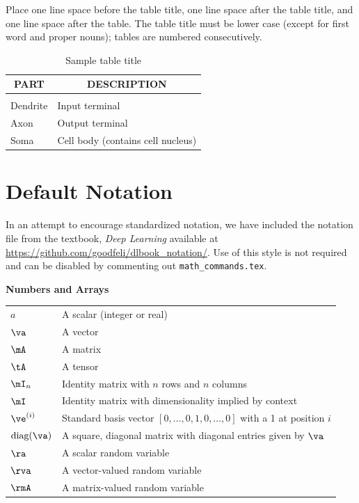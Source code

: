 \documentclass{article} %
\begin{document}
Place one line space before the table title, one line space after the table
title, and one line space after the table. The table title must be lower case
(except for first word and proper nouns); tables are numbered consecutively.

\begin{table}[t]
\caption{Sample table title}
\label{sample-table}
\begin{center}
\begin{tabular}{ll}
\multicolumn{1}{c}{\bf PART}  &\multicolumn{1}{c}{\bf DESCRIPTION}
\\ \hline \\
Dendrite         &Input terminal \\
Axon             &Output terminal \\
Soma             &Cell body (contains cell nucleus) \\
\end{tabular}
\end{center}
\end{table}

\section{Default Notation}

In an attempt to encourage standardized notation, we have included the
notation file from the textbook, \textit{Deep Learning}
\cite{goodfellow2016deep} available at
\url{https://github.com/goodfeli/dlbook_notation/}.  Use of this style
is not required and can be disabled by commenting out
\texttt{math\_commands.tex}.


\centerline{\bf Numbers and Arrays}
\bgroup
\def\arraystretch{1.5}
\begin{tabular}{p{1in}p{3.25in}}
$\displaystyle a$ & A scalar (integer or real)\\
$\displaystyle \va$ & A vector\\
$\displaystyle \mA$ & A matrix\\
$\displaystyle \tA$ & A tensor\\
$\displaystyle \mI_n$ & Identity matrix with $n$ rows and $n$ columns\\
$\displaystyle \mI$ & Identity matrix with dimensionality implied by context\\
$\displaystyle \ve^{(i)}$ & Standard basis vector $[0,\dots,0,1,0,\dots,0]$ with a 1 at position $i$\\
$\displaystyle \text{diag}(\va)$ & A square, diagonal matrix with diagonal entries given by $\va$\\
$\displaystyle \ra$ & A scalar random variable\\
$\displaystyle \rva$ & A vector-valued random variable\\
$\displaystyle \rmA$ & A matrix-valued random variable\\
\end{tabular}
\egroup
\vspace{0.25cm}
\end{document}
